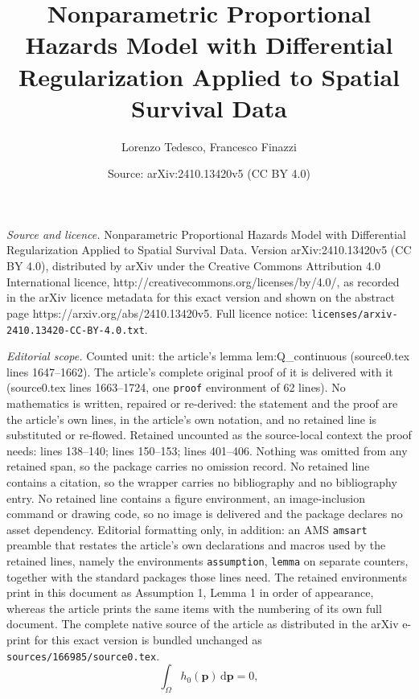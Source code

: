 \documentclass[10pt,a4paper]{amsart}
\title{Nonparametric Proportional Hazards Model with Differential Regularization Applied to Spatial Survival Data}
\author{Lorenzo Tedesco, Francesco Finazzi}
\date{Source: arXiv:2410.13420v5 (CC BY 4.0)}
\begin{document}
\maketitle

\noindent\emph{Source and licence.} Nonparametric Proportional Hazards Model with Differential Regularization Applied to Spatial Survival Data. Version arXiv:2410.13420v5 (CC BY 4.0), distributed by arXiv under the Creative Commons Attribution 4.0 International licence, http://creativecommons.org/licenses/by/4.0/, as recorded in the arXiv licence metadata for this exact version and shown on the abstract page https://arxiv.org/abs/2410.13420v5. Full licence notice: \texttt{licenses/arxiv-2410.13420-CC-BY-4.0.txt}.\par\smallskip

\noindent\textit{Editorial scope.} Counted unit: the article's lemma lem:Q\_continuous (source0.tex lines 1647--1662). The article's complete original proof of it is delivered with it (source0.tex lines 1663--1724, one \texttt{proof} environment of 62 lines). No mathematics is written, repaired or re-derived: the statement and the proof are the article's own lines, in the article's own notation, and no retained line is substituted or re-flowed.  Retained uncounted as the source-local context the proof needs: lines 138--140; lines 150--153; lines 401--406.  Nothing was omitted from any retained span, so the package carries no omission record.  No retained line contains a citation, so the wrapper carries no bibliography and no bibliography entry.  No retained line contains a figure environment, an image-inclusion command or drawing code, so no image is delivered and the package declares no asset dependency.  Editorial formatting only, in addition: an AMS \texttt{amsart} preamble that restates the article's own declarations and macros used by the retained lines, namely the environments \texttt{assumption}, \texttt{lemma} on separate counters, together with the standard packages those lines need.  The retained environments print in this document as Assumption 1, Lemma 1 in order of appearance, whereas the article prints the same items with the numbering of its own full document.  The complete native source of the article as distributed in the arXiv e-print for this exact version is bundled unchanged as \texttt{sources/166985/source0.tex}.
\begin{equation}\label{eq:identification_h}
\int_{\Omega} h_0(\bm{p})\,\mathrm{d}\bm{p} = 0,
\end{equation}
\end{document}
